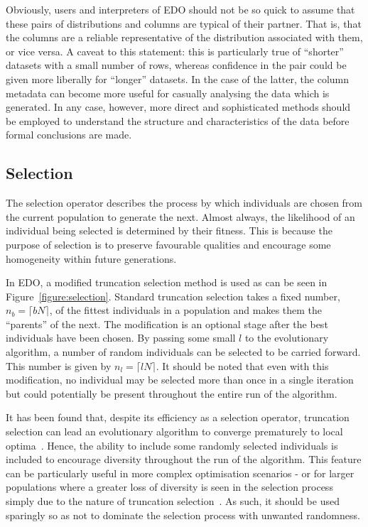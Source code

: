 Obviously, users and interpreters of EDO should not be so quick to assume that
these pairs of distributions and columns are typical of their partner. That is,
that the columns are a reliable representative of the distribution associated
with them, or vice versa. A caveat to this statement: this is particularly true
of ``shorter'' datasets with a small number of rows, whereas confidence in the
pair could be given more liberally for ``longer'' datasets. In the case of the
latter, the column metadata can become more useful for casually analysing the
data which is generated. In any case, however, more direct and sophisticated
methods should be employed to understand the structure and characteristics of
the data before formal conclusions are made.



\subsection{Selection}

The selection operator describes the process by which individuals are chosen
from the current population to generate the next. Almost always, the likelihood
of an individual being selected is determined by their fitness. This is because
the purpose of selection is to preserve favourable qualities and encourage some
homogeneity within future generations.


In EDO, a modified truncation selection method is used as can be seen in
Figure~\ref{figure:selection}. Standard truncation selection takes a fixed
number, \(n_b = \lceil bN\rceil\), of the fittest individuals in a population
and makes them the ``parents'' of the next. The modification is an optional
stage after the best individuals have been chosen. By passing some small \(l\)
to the evolutionary algorithm, a number of random individuals can be selected to
be carried forward. This number is given by \(n_l = \lceil lN \rceil\). It
should be noted that even with this modification, no individual may be selected
more than once in a single iteration but could potentially be present throughout
the entire run of the algorithm.



It has been found that, despite its efficiency as a selection
operator, truncation selection can lead an evolutionary algorithm to
converge prematurely to local optima~\cite{Jebari2013}. Hence, the ability to
include some randomly selected individuals is included to encourage diversity
throughout the run of the algorithm. This feature can be particularly useful in
more complex optimisation scenarios \-- or for larger populations where a
greater loss of diversity is seen in the selection process simply due to the
nature of truncation selection~\cite{Tatsuya2002}. As such, it should be used
sparingly so as not to dominate the selection process with unwanted randomness.

